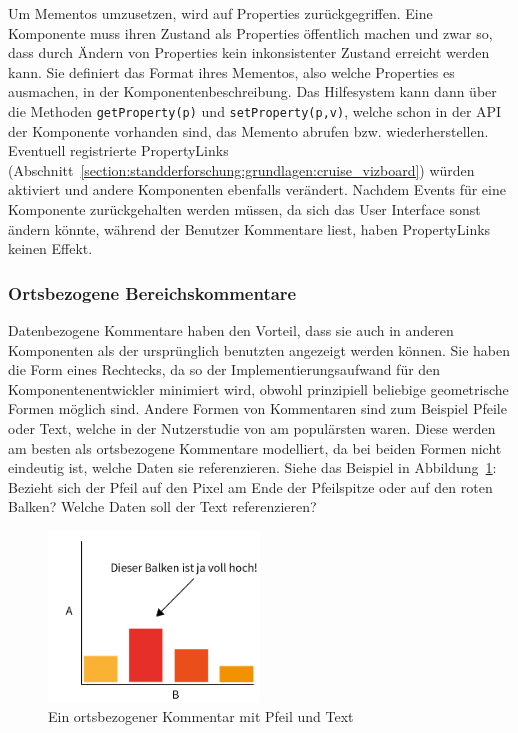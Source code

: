 \documentclass[
	headsepline,
	footsepline,
	fontsize=12pt,
	bibliography=totoc
]{scrbook}
\begin{document}
Um Mementos umzusetzen, wird auf Properties zurückgegriffen. Eine Komponente muss ihren Zustand als Properties öffentlich machen und zwar so, dass durch Ändern von Properties kein inkonsistenter Zustand erreicht werden kann. Sie definiert das Format ihres Mementos, also welche Properties es ausmachen, in der Komponentenbeschreibung. Das Hilfesystem kann dann über die Methoden \texttt{getProperty(p)} und \texttt{setProperty(p,v)}, welche schon in der API der Komponente vorhanden sind, das Memento abrufen bzw. wiederherstellen. Eventuell registrierte PropertyLinks (Abschnitt~\ref{section:standderforschung:grundlagen:cruise_vizboard}) würden aktiviert und andere Komponenten ebenfalls verändert. Nachdem Events für eine Komponente zurückgehalten werden müssen, da sich das User Interface sonst ändern könnte, während der Benutzer Kommentare liest, haben PropertyLinks keinen Effekt.

\subsubsection{Ortsbezogene Bereichskommentare}

Datenbezogene Kommentare haben den Vorteil, dass sie auch in anderen Komponenten als der ursprünglich benutzten angezeigt werden können. Sie haben die Form eines Rechtecks, da so der Implementierungsaufwand für den Komponentenentwickler minimiert wird, obwohl prinzipiell beliebige geometrische Formen möglich sind. Andere Formen von Kommentaren sind zum Beispiel Pfeile oder Text, welche in der Nutzerstudie von \cite{Heer2007} am populärsten waren. Diese werden am besten als ortsbezogene Kommentare modelliert, da bei beiden Formen nicht eindeutig ist, welche Daten sie referenzieren. Siehe das Beispiel in Abbildung~\ref{figure:ortsbezogen}: Bezieht sich der Pfeil auf den Pixel am Ende der Pfeilspitze oder auf den roten Balken? Welche Daten soll der Text referenzieren?

\begin{figure}[htbp]
   \centering
   \includegraphics[width=0.5\textwidth]{images/konzeption-ortsbezogen.png}
   \caption{Ein ortsbezogener Kommentar mit Pfeil und Text}
   \label{figure:ortsbezogen}
\end{figure}
\end{document}
